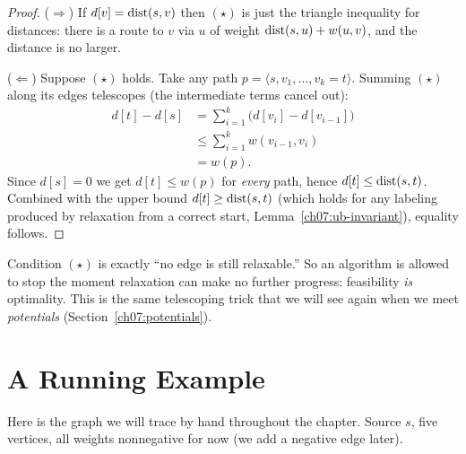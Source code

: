 \begin{proof}
($\Rightarrow$) If $d[v]=\operatorname{dist}(s,v)$ then $(\star)$ is just the triangle inequality for
distances: there is a route to $v$ via $u$ of weight $\operatorname{dist}(s,u)+w(u,v)$, and the distance
is no larger.

($\Leftarrow$) Suppose $(\star)$ holds. Take any path $p=\langle s,v_1,\dots,v_k=t\rangle$.
Summing $(\star)$ along its edges telescopes (the intermediate terms cancel out):
\begin{align*}
   d[t]-d[s] &= \sum_{i=1}^{k}\bigl(d[v_i]-d[v_{i-1}]\bigr) \\
             &\le \sum_{i=1}^{k} w(v_{i-1},v_i) \\
             &= w(p).
\end{align*}
Since $d[s]=0$ we get $d[t]\le w(p)$ for \emph{every} path, hence $d[t]\le\operatorname{dist}(s,t)$.
Combined with the upper bound $d[t]\ge\operatorname{dist}(s,t)$ (which holds for any labeling produced by
relaxation from a correct start, Lemma~\ref{ch07:ub-invariant}), equality follows.
\end{proof}

\begin{whybox}
Condition $(\star)$ is exactly ``no edge is still relaxable.'' So an algorithm is allowed
to stop the moment relaxation can make no further progress: feasibility \emph{is}
optimality. This is the same telescoping trick that we will see again
when we meet \emph{potentials} (Section~\ref{ch07:potentials}).
\end{whybox}

\section{A Running Example}
\label{ch07:running-graph}

Here is the graph we will trace by hand throughout the chapter. Source $s$, five vertices,
all weights nonnegative for now (we add a negative edge later).

\begin{center}
\end{center}

